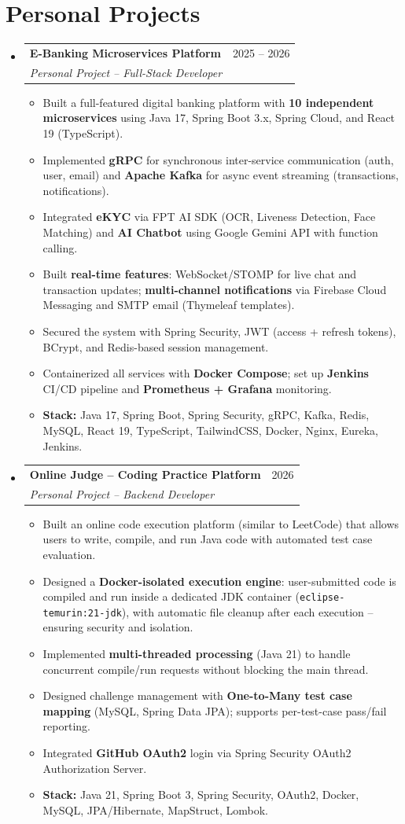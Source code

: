 \documentclass[letterpaper,11pt]{article}
\makeatletter
\newcommand{\resumeSubheading}[4]{
  \vspace{-1pt}\item
    \begin{tabular*}{0.97\textwidth}{l@{\extracolsep{\fill}}r}
      \textbf{#1} & #2 \\
      \textit{\small#3} & \textit{\small #4} \\
    \end{tabular*}\vspace{-5pt}
}
\newcommand{\resumeSubHeadingListStart}{\begin{itemize}[leftmargin=*]}
\newcommand{\resumeSubHeadingListEnd}{\end{itemize}}
\newcommand{\resumeItemListStart}{\begin{itemize}}
\newcommand{\resumeItemListEnd}{\end{itemize}\vspace{-5pt}}
\makeatother
\begin{document}
%

\section{Personal Projects}
\resumeSubHeadingListStart
    \resumeSubheading
      {E-Banking Microservices Platform}{2025 -- 2026}
      {Personal Project -- Full-Stack Developer}{}
      \resumeItemListStart
        \item Built a full-featured digital banking platform with \textbf{10 independent microservices} using Java 17, Spring Boot 3.x, Spring Cloud, and React 19 (TypeScript).
        \item Implemented \textbf{gRPC} for synchronous inter-service communication (auth, user, email) and \textbf{Apache Kafka} for async event streaming (transactions, notifications).
        \item Integrated \textbf{eKYC} via FPT AI SDK (OCR, Liveness Detection, Face Matching) and \textbf{AI Chatbot} using Google Gemini API with function calling.
        \item Built \textbf{real-time features}: WebSocket/STOMP for live chat and transaction updates; \textbf{multi-channel notifications} via Firebase Cloud Messaging and SMTP email (Thymeleaf templates).
        \item Secured the system with Spring Security, JWT (access + refresh tokens), BCrypt, and Redis-based session management.
        \item Containerized all services with \textbf{Docker Compose}; set up \textbf{Jenkins} CI/CD pipeline and \textbf{Prometheus + Grafana} monitoring.
        \item \textbf{Stack:} Java 17, Spring Boot, Spring Security, gRPC, Kafka, Redis, MySQL, React 19, TypeScript, TailwindCSS, Docker, Nginx, Eureka, Jenkins.
      \resumeItemListEnd

    \resumeSubheading
      {Online Judge -- Coding Practice Platform}{2026}
      {Personal Project -- Backend Developer}{}
      \resumeItemListStart
        \item Built an online code execution platform (similar to LeetCode) that allows users to write, compile, and run Java code with automated test case evaluation.
        \item Designed a \textbf{Docker-isolated execution engine}: user-submitted code is compiled and run inside a dedicated JDK container (\texttt{eclipse-temurin:21-jdk}), with automatic file cleanup after each execution -- ensuring security and isolation.
        \item Implemented \textbf{multi-threaded processing} (Java 21) to handle concurrent compile/run requests without blocking the main thread.
        \item Designed challenge management with \textbf{One-to-Many test case mapping} (MySQL, Spring Data JPA); supports per-test-case pass/fail reporting.
        \item Integrated \textbf{GitHub OAuth2} login via Spring Security OAuth2 Authorization Server.
        \item \textbf{Stack:} Java 21, Spring Boot 3, Spring Security, OAuth2, Docker, MySQL, JPA/Hibernate, MapStruct, Lombok.
      \resumeItemListEnd
\resumeSubHeadingListEnd
\end{document}
